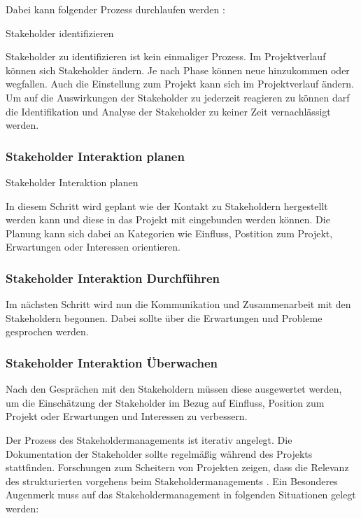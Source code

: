 \documentclass[ThesisDJ.tex]{subfiles}
\begin{document}
Dabei kann folgender Prozess durchlaufen werden \cite[S.~487]{project_management_institute_guide_2017}:

Stakeholder identifizieren

Stakeholder zu identifizieren ist kein einmaliger Prozess. Im Projektverlauf können sich Stakeholder ändern. 
Je nach Phase können neue hinzukommen oder wegfallen. Auch die Einstellung zum Projekt kann sich im Projektverlauf ändern. 
Um auf die Auswirkungen der Stakeholder zu jederzeit reagieren zu können darf die Identifikation und Analyse der Stakeholder 
zu keiner Zeit vernachlässigt werden.

\subsubsection{Stakeholder Interaktion planen}
Stakeholder Interaktion planen

In diesem Schritt wird geplant wie der Kontakt zu Stakeholdern hergestellt werden kann und diese in das Projekt mit eingebunden werden können. 
Die Planung kann sich dabei an Kategorien wie Einfluss, Postition zum Projekt, Erwartungen oder Interessen orientieren.

\subsubsection{Stakeholder Interaktion Durchführen}


Im nächsten Schritt wird nun die Kommunikation und Zusammenarbeit mit den Stakeholdern begonnen. 
Dabei sollte über die Erwartungen und Probleme gesprochen werden.

\subsubsection{Stakeholder Interaktion Überwachen}

Nach den Gesprächen mit den Stakeholdern müssen diese ausgewertet werden, um die Einschätzung der Stakeholder im Bezug auf Einfluss,
Position zum Projekt oder Erwartungen und Interessen zu verbessern.


Der Prozess des Stakeholdermanagements ist iterativ angelegt. Die Dokumentation der Stakeholder sollte regelmäßig während
des Projekts stattfinden. Forschungen zum Scheitern von Projekten zeigen, dass die Relevanz des strukturierten vorgehens 
beim Stakeholdermanagements \cite[S.~488]{project_management_institute_guide_2017}.
Ein Besonderes Augenmerk muss auf das Stakeholdermanagement in folgenden Situationen gelegt werden:
\end{document}
